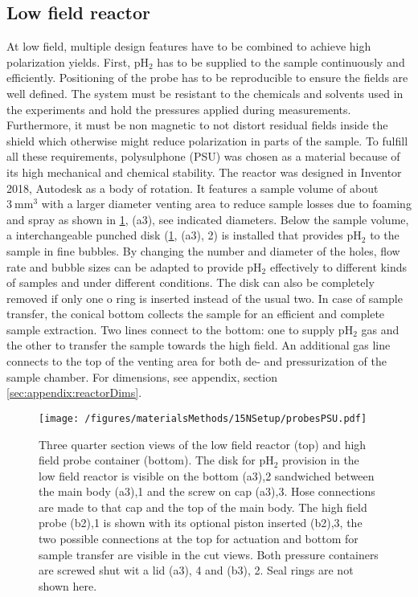         \subsection{Low field reactor}
        \label{sec:matMeth:lowFieldReactor}
        At low field, multiple design features have to be combined to achieve high polarization yields.  First, pH$_2$ has to be supplied to the sample continuously and efficiently. Positioning of the probe has to be reproducible to ensure the fields are well defined.  The system must be resistant to the chemicals and solvents used in the experiments and hold the pressures applied during measurements.  Furthermore, it must be non magnetic to not distort residual fields inside the shield which otherwise might reduce polarization in parts of the sample. To fulfill all these requirements, polysulphone (PSU) was chosen as a material because of its high mechanical and chemical stability.  The reactor was designed in Inventor 2018, Autodesk as a body of rotation. It features a sample volume of about $\SI{3}{\mm\cubed}$ with a larger diameter venting area to reduce sample losses due to foaming and spray as shown in \ref{figure:materialsMethods:probesPSU}, (a3), see indicated diameters. Below the sample volume, a interchangeable punched disk (\ref{figure:materialsMethods:probesPSU}, (a3), 2) is installed that provides pH$_2$ to the sample in fine bubbles. By changing the number and diameter of the holes, flow rate and bubble sizes can be adapted to provide pH$_2$ effectively to different kinds of samples and under different conditions. The disk can also be completely removed if only one o ring is inserted instead of the usual two. In case of sample transfer, the conical bottom collects the sample for an efficient and complete sample extraction.  Two lines connect to the bottom: one to supply pH$_2$ gas and the other to transfer the sample towards the high field.  An additional gas line connects to the top of the venting area for both de- and pressurization of the sample chamber.
        For dimensions, see appendix, section \ref{sec:appendix:reactorDims}.
            \begin{figure}
                \centering
                \texttt{[image: /figures/materialsMethods/15NSetup/probesPSU.pdf]}
                \caption[Reactor gemometry]{Three quarter section views of the low field reactor (top) and high field probe container (bottom). The disk for pH$_2$ provision in the low field reactor is visible on the bottom (a3),2 sandwiched between the main body (a3),1 and the screw on cap (a3),3.  Hose connections are made to that cap and the top of the main body. The high field probe (b2),1 is shown with its optional piston inserted (b2),3, the two possible connections at the top for actuation and bottom for sample transfer are visible in the cut views. Both pressure containers are screwed shut wit a lid (a3), 4 and (b3), 2. Seal rings are not shown here.}
                \label{figure:materialsMethods:probesPSU}
            \end{figure}

